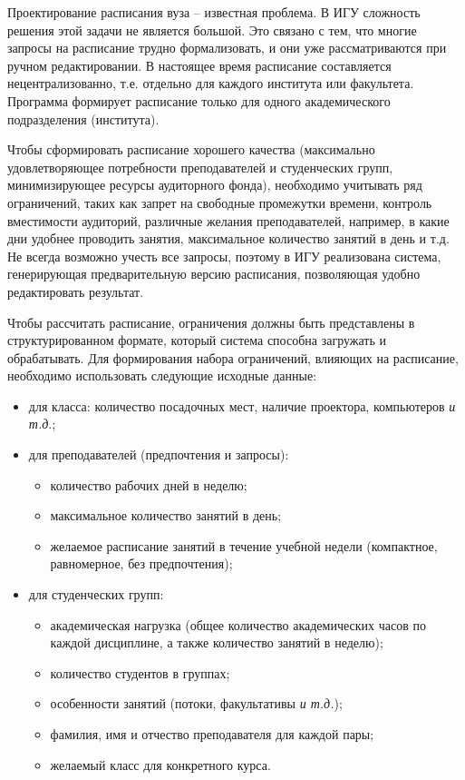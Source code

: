 \documentclass[
]{aiitart}
\begin{document}
Проектирование расписания вуза -- известная проблема. В ИГУ сложность решения этой задачи не является большой. Это связано с тем, что многие запросы на расписание трудно формализовать, и они уже рассматриваются при ручном редактировании. В настоящее время расписание составляется нецентрализованно, т.е. отдельно для каждого института или факультета.  Программа формирует расписание только для одного академического подразделения (института).

Чтобы сформировать расписание хорошего качества (максимально удовлетворяющее потребности преподавателей и студенческих групп, минимизирующее ресурсы аудиторного фонда), необходимо учитывать ряд ограничений, таких как запрет на свободные промежутки времени, контроль вместимости аудиторий, различные желания преподавателей, например, в какие дни удобнее проводить занятия, максимальное количество занятий в день и т.д. Не всегда возможно учесть все запросы, поэтому в ИГУ реализована система, генерирующая предварительную версию расписания, позволяющая удобно редактировать результат.

Чтобы рассчитать расписание, ограничения должны быть представлены в структурированном формате, который система способна загружать и обрабатывать. Для формирования набора ограничений, влияющих на расписание, необходимо использовать следующие исходные данные:
\begin{itemize}
\item для класса: количество посадочных мест, наличие проектора, компьютеров \emph{и т.д}.;
\item для преподавателей (предпочтения и запросы):
\begin{itemize}
\item количество рабочих дней в неделю;
\item максимальное количество занятий в день;
\item желаемое расписание занятий в течение учебной недели (компактное, равномерное, без предпочтения);
\end{itemize}
\item для студенческих групп:
\begin{itemize}
\item академическая нагрузка (общее количество академических часов по каждой дисциплине, а также количество занятий в неделю); \item количество студентов в группах;
\item особенности занятий (потоки, факультативы \emph{и т.д.}); \item фамилия, имя и отчество преподавателя для каждой пары;
\item желаемый класс для конкретного курса.
\end{itemize}
\end{itemize}
\end{document}
